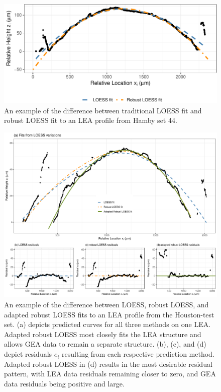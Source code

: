 \documentclass[12pt]{article}
\begin{document}
\begin{figure}
\centering
\includegraphics{writeup_files/figure-latex/loess-vs-locfit-1.pdf}
\caption{\label{loess-vs-locfit}An example of the difference between
traditional LOESS fit and robust LOESS fit to an LEA profile from Hamby
set 44.}
\end{figure}

\begin{figure}
\centering
\includegraphics[width=\textwidth]{../images/loess_comparison_plot_all_wide}
\caption{An example of the difference between LOESS, robust LOESS, and adapted robust LOESS fits to an LEA profile from the Houston-test set. (a) depicts predicted curves for all three methods on one LEA. Adapted robust LOESS most closely fits the LEA structure and allows GEA data to remain a separate structure. (b), (c), and (d) depict residuals $e_i$ resulting from each respective prediction method. Adapted robust LOESS in (d) results in the most desirable residual pattern, with LEA data residuals remaining closer to zero, and GEA data residuals being positive and large.}
\label{houston-adapted-rlo-pdf}
\end{figure}
\end{document}
